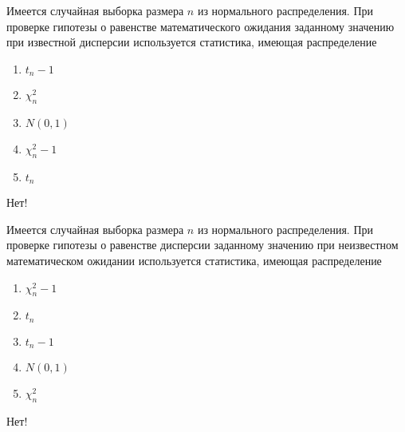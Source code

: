 \documentclass[t]{beamer}
\begin{document}
 \begin{frame} \label{41-No} 
\begin{block}{41} 

Имеется случайная выборка размера $n$ из нормального распределения. При проверке гипотезы о равенстве математического ожидания заданному значению при известной дисперсии используется статистика, имеющая распределение
 


 \end{block} 
\begin{enumerate} 
\item[] \hyperlink{41-No}{\beamergotobutton{}  $t_n-1$}
\item[] \hyperlink{41-No}{\beamergotobutton{} $\chi^2_n$}
\item[] \hyperlink{41-Yes}{\beamergotobutton{} $N(0,1)$}
\item[] \hyperlink{41-No}{\beamergotobutton{} $\chi^2_n-1$}
\item[] \hyperlink{41-No}{\beamergotobutton{} $t_n$}
\end{enumerate} 

 \alert{Нет!} 
\end{frame} 


 \begin{frame} \label{42-No} 
\begin{block}{42} 

Имеется случайная выборка размера $n$ из нормального распределения. При проверке гипотезы о равенстве дисперсии заданному значению при неизвестном математическом ожидании используется статистика, имеющая распределение
 


 \end{block} 
\begin{enumerate} 
\item[] \hyperlink{42-Yes}{\beamergotobutton{} $\chi^2_n-1$}
\item[] \hyperlink{42-No}{\beamergotobutton{} $t_n$}
\item[] \hyperlink{42-No}{\beamergotobutton{}  $t_n-1$}
\item[] \hyperlink{42-No}{\beamergotobutton{} $N(0,1)$}
\item[] \hyperlink{42-No}{\beamergotobutton{} $\chi^2_n$}
\end{enumerate} 

 \alert{Нет!} 
\end{frame} 
\end{document}
